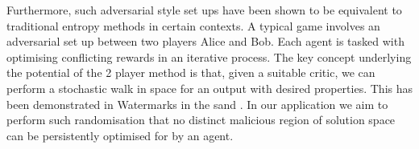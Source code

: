  
 
 Furthermore, such adversarial style set ups have been shown to be equivalent to traditional entropy methods in certain contexts. A typical game involves an adversarial set up between two players Alice and Bob. Each agent is tasked with optimising conflicting rewards in an iterative process. The key concept underlying the potential of the 2 player method is that, given a suitable critic, we can perform a stochastic walk in space for an output with desired properties. This has been demonstrated in Watermarks in the sand \citep{zhang_watermarks_2025}. In our application we aim to perform such randomisation that no distinct malicious region of solution space can be persistently optimised for by an agent.
















